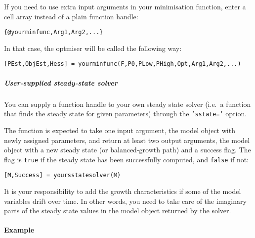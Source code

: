 If you need to use extra input arguments in your minimisation function,
enter a cell array instead of a plain function handle:

\begin{verbatim}
{@yourminfunc,Arg1,Arg2,...}
\end{verbatim}

In that case, the optmiser will be called the following way:

\begin{verbatim}
[PEst,ObjEst,Hess] = yourminfunc(F,P0,PLow,PHigh,Opt,Arg1,Arg2,...)
\end{verbatim}

\subparagraph{User-supplied steady-state
solver}\label{user-supplied-steady-state-solver}

You can supply a function handle to your own steady state solver (i.e.~a
function that finds the steady state for given parameters) through the
\texttt{'sstate='} option.

The function is expected to take one input argument, the model object
with newly assigned parameters, and return at least two output
arguments, the model object with a new steady state (or balanced-growth
path) and a success flag. The flag is \texttt{true} if the steady state
has been successfully computed, and \texttt{false} if not:

\begin{verbatim}
[M,Success] = yoursstatesolver(M)
\end{verbatim}

It is your responsibility to add the growth characteristics if some of
the model variables drift over time. In other words, you need to take
care of the imaginary parts of the steady state values in the model
object returned by the solver.

\paragraph{Example}\label{example}


